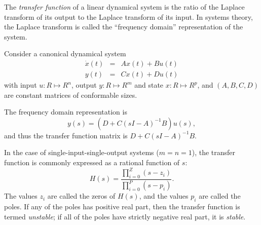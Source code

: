 \documentclass[12pt]{article}
\begin{document}
The \emph{transfer function} of a linear dynamical system is the ratio of the Laplace transform of its output to the Laplace transform of its input.  In systems theory, the Laplace transform is called the ``frequency domain'' representation of the system.

Consider a canonical dynamical system
\begin{eqnarray*}
    \dot x(t) &=& A x(t) + B u(t) \\
    y (t) &=& C x(t) + D u(t)
\end{eqnarray*}
with input $u: R \mapsto R^n$, output $y: R \mapsto R^m$ and state $x:R \mapsto R^p$, and $(A,B,C,D)$ are constant matrices of conformable sizes.

The frequency domain representation is
$$
    y(s) = (D + C(sI - A)^{-1}B)u(s),
$$
and thus the transfer function matrix is $D + C(sI - A)^{-1}B$.

In the case of single-input-single-output systems ($m=n=1$), the transfer function is commonly expressed as a rational function of $s$:
$$
    H(s) = \frac{\prod_{i=0}^Z (s - z_i)}{\prod_{i=0}^P (s - p_i)}.
$$
The values $z_i$ are called the zeros of $H(s)$, and the values $p_i$ are called the poles.  If any of the poles has positive real part, then the transfer function is termed \emph{unstable}; if all of the poles have strictly negative real part, it is \emph{stable}.
\end{document}
